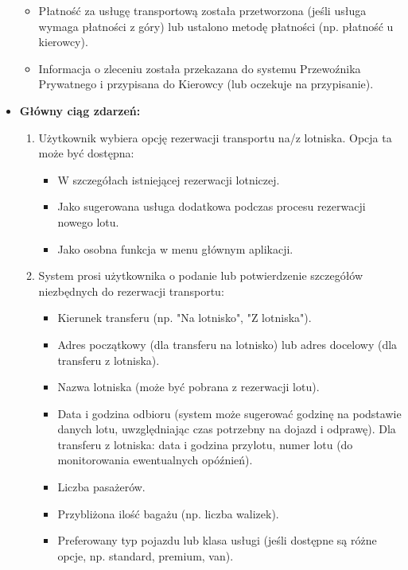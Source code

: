 \documentclass[a4paper,12pt]{article}
\begin{document}
\begin{itemize}
\begin{itemize}
            \item Płatność za usługę transportową została przetworzona (jeśli usługa wymaga płatności z góry) lub ustalono metodę płatności (np. płatność u kierowcy).
            \item Informacja o zleceniu została przekazana do systemu Przewoźnika Prywatnego i przypisana do Kierowcy (lub oczekuje na przypisanie).
        \end{itemize}
    \item \textbf{Główny ciąg zdarzeń:}
        \begin{enumerate}
            \item Użytkownik wybiera opcję rezerwacji transportu na/z lotniska. Opcja ta może być dostępna:
                \begin{itemize}
                    \item W szczegółach istniejącej rezerwacji lotniczej.
                    \item Jako sugerowana usługa dodatkowa podczas procesu rezerwacji nowego lotu.
                    \item Jako osobna funkcja w menu głównym aplikacji.
                \end{itemize}
            \item System prosi użytkownika o podanie lub potwierdzenie szczegółów niezbędnych do rezerwacji transportu:
                \begin{itemize}
                    \item Kierunek transferu (np. "Na lotnisko", "Z lotniska").
                    \item Adres początkowy (dla transferu na lotnisko) lub adres docelowy (dla transferu z lotniska).
                    \item Nazwa lotniska (może być pobrana z rezerwacji lotu).
                    \item Data i godzina odbioru (system może sugerować godzinę na podstawie danych lotu, uwzględniając czas potrzebny na dojazd i odprawę). Dla transferu z lotniska: data i godzina przylotu, numer lotu (do monitorowania ewentualnych opóźnień).
                    \item Liczba pasażerów.
                    \item Przybliżona ilość bagażu (np. liczba walizek).
                    \item Preferowany typ pojazdu lub klasa usługi (jeśli dostępne są różne opcje, np. standard, premium, van).
                \end{itemize}

\end{enumerate}
\end{itemize}
\end{document}
